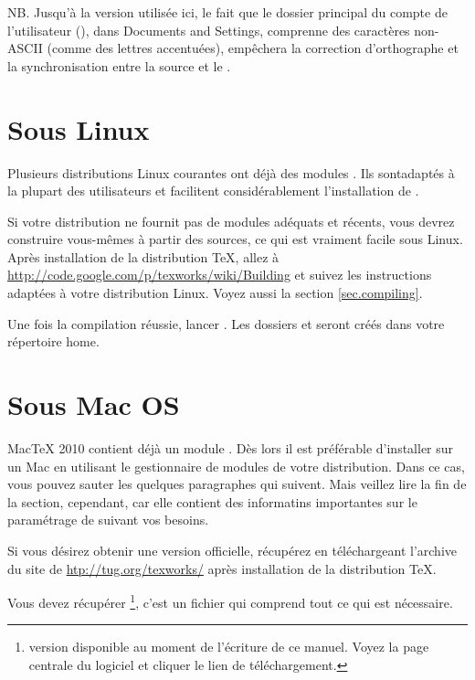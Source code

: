 NB. Jusqu'à la version utilisée ici, le fait que le dossier principal du compte de l'utilisateur (), dans \og Documents and Settings\fg, comprenne des caractères non-ASCII (comme des lettres accentuées), empêchera la correction d'orthographe et la synchronisation entre la source et le .

\section{Sous Linux}

Plusieurs distributions Linux courantes ont déjà des modules \Tw. Ils sontadaptés à la plupart des utilisateurs et facilitent considérablement l'installation de \Tw.

Si votre distribution ne fournit pas de modules adéquats et récents, vous devrez construire vous-mêmes \Tw{} à partir des sources, ce qui est vraiment facile sous Linux. Après installation de la distribution \TeX, allez à \url{http://code.google.com/p/texworks/wiki/Building} et suivez les instructions adaptées à votre distribution Linux. Voyez aussi la section \ref{sec.compiling}.

Une fois la compilation réussie, lancer \Tw{}. Les dossiers  et  seront créés dans votre répertoire home.

\section{Sous Mac OS}

MacTeX 2010 contient déjà un module \Tw. Dès lors il est préférable d'installer \Tw{} sur un Mac en utilisant le gestionnaire de modules de votre distribution. Dans ce cas, vous pouvez sauter les quelques paragraphes qui suivent. Mais veillez lire la fin de la section, cependant, car elle contient des informatins importantes sur le paramétrage de \Tw{} suivant vos besoins.

Si vous désirez obtenir une version \og officielle\fg{}, récupérez \Tw{} en téléchargeant l'archive du site de \Tw{} \url{htp://tug.org/texworks/} après installation de la distribution {\TeX}.

Vous devez récupérer \footnote{version disponible au moment de l'écriture de ce manuel. Voyez la page centrale du logiciel et cliquer le lien de téléchargement.}, c'est un fichier qui comprend tout ce qui est nécessaire.

